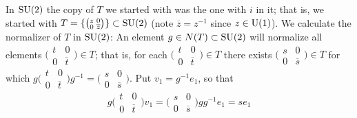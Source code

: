 \documentclass[../../rtnotes.tex]{subfiles}
\begin{document}
In $\operatorname{SU}(2)$ the copy of $T$ we started with was the one with $i$ in it; that is, we started with $T = \{\bigl(\!\begin{smallmatrix}
    z & 0 \\ 0 & \overline z
\end{smallmatrix}\!\bigr)\}\subset \operatorname{SU}(2)$ (note $\overline z = z^{-1}$ since $z\in \operatorname{U}(1)$). We calculate the normalizer of $T$ in $\operatorname{SU}(2)$: An element $g\in N(T)\subset \operatorname{SU}(2)$ will normalize all elements $\bigl(\!\begin{smallmatrix}
    t & 0 \\ 0 & \overline t
\end{smallmatrix}\!\bigr)\in T$; that is, for each $\bigl(\!\begin{smallmatrix}
    t & 0 \\ 0 & \overline t
\end{smallmatrix}\!\bigr)\in T$ there exists $\bigl(\!\begin{smallmatrix}
    s & 0 \\ 0 & \overline s
\end{smallmatrix}\!\bigr)\in T$ for which $g\bigl(\!\begin{smallmatrix}
    t & 0 \\ 0 & \overline t
\end{smallmatrix}\!\bigr)g^{-1} = \bigl(\!\begin{smallmatrix}
    s & 0 \\ 0 & \overline s
\end{smallmatrix}\!\bigr)$. Put $v_1 = g^{-1}e_1$, so that 
\[g\bigl(\!\begin{smallmatrix}
    t & 0 \\ 0 & \overline t
\end{smallmatrix}\!\bigr)v_1 = \bigl(\!\begin{smallmatrix}
    s & 0 \\ 0 & \overline s
\end{smallmatrix}\!\bigr)gg^{-1}e_1 = se_1\]
\end{document}
